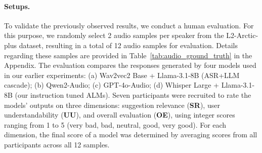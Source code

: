 \documentclass[11pt]{article}
\begin{document}
\paragraph{Setups.} To validate the previously observed results, we conduct a human evaluation. For this purpose, we randomly select 2 audio samples per speaker from the L2-Arctic-plus dataset, resulting in a total of 12 audio samples for evaluation. Details regarding these samples are provided in Table~\ref{tab:audio_ground_truth} in the Appendix. The evaluation compares the responses generated by four models used in our earlier experiments: (a) Wav2vec2 Base + Llama-3.1-8B (ASR+LLM cascade); (b) Qwen2-Audio; (c) GPT-4o-Audio; (d) Whisper Large + Llama-3.1-8B (our instruction tuned ALMs). Seven participants were recruited to rate the models' outputs on three dimensions: suggestion relevance (\textbf{SR}), user understandability (\textbf{UU}), and overall evaluation (\textbf{OE}), using integer scores ranging from 1 to 5 (very bad, bad, neutral, good, very good). For each dimension, the final score of a model was determined by averaging scores from all participants across all 12 samples.

\end{document}
